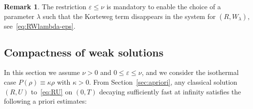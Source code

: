 \documentclass[10pt]{amsart}
\theoremstyle{definition}\newtheorem{defi}[theo]{Definition}\newtheorem{rema}[theo]{Remark}\newtheorem{exam}[theo]{Example}\newtheorem{exem}[theo]{Example}\newtheorem{nota}[theo]{Notation}
\newcommand*\<{\left\langle}
\renewcommand*\>{\right\rangle}
\renewcommand*\le{\leqslant}
\begin{document}
\begin{rema}
The restriction $\varepsilon \le \nu$ is mandatory to enable the choice of a parameter $\lambda$ such that the Korteweg term disappears in the system for $(R,W_\lambda)$, see~\eqref{eq:RWlambda-eps}.
\end{rema}

\subsection{Compactness of weak solutions}

In this section we assume $\nu >0$ and $0 \le \varepsilon \le \nu$, and we consider the isothermal case $P(\rho)\equiv \kappa \rho$ with $\kappa >0$. From Section~\ref{sec:apriori}, any classical solution $(R,U)$ to~\eqref{eq:RU} on $(0,T)$ decaying sufficiently fast at infinity satisfies the following a priori estimates:
\end{document}
